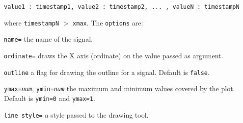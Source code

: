 \begin{verbatim}
value1 : timestamp1, value2 : timestamp2, ... , valueN : timestampN
\end{verbatim}

\noindent where \texttt{timestampN} $>$ \texttt{xmax}. The \texttt{options} are:

\begin{optionslist}
\item \texttt{name=} the name of the signal.
\item \texttt{ordinate=} draws the X axis (ordinate) on the value passed as argument.
\item \texttt{outline} a flag for drawing the outline for a signal. Default is \texttt{false}.
\item \texttt{ymax=\it num}, \texttt{ymin=\it num} the maximum and minimum values covered by the plot. Default is \texttt{ymin=0} and \texttt{ymax=1}.
\item \texttt{line style=} a style passed to the drawing tool.
\end{optionslist}

